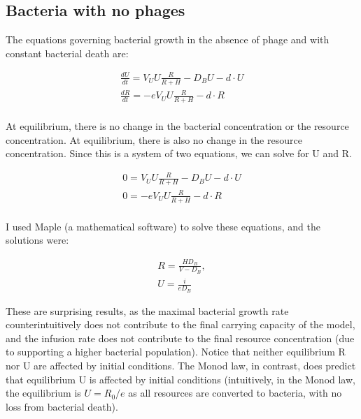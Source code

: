 \documentclass{article}
\begin{document}
\subsection{Bacteria with no phages}
The equations governing bacterial growth in the absence of phage and with constant bacterial death are:

\begin{equation}
\begin{split}
\frac{dU}{dt} = V_UU\frac{R}{R+H} - D_BU - d \cdot U \\
\frac{dR}{dt} = -eV_UU\frac{R}{R+H}  - d \cdot R \\
\end{split}
\end{equation}

At equilibrium, there is no change in the bacterial concentration or the resource concentration. At equilibrium, there is also no change in the resource concentration. Since this is a system of two equations, we can solve for U and R. 

\begin{equation}
\begin{split}
0 = V_UU\frac{R}{R+H} - D_BU - d \cdot U \\
0 = -eV_UU\frac{R}{R+H}  - d \cdot R \\
\end{split}
\end{equation}

I used Maple (a mathematical software) to solve these equations, and the solutions were:

\begin{equation}
\begin{split}
R = \frac{HD_B}{V - D_B}, \\ U = \frac{i}{eD_B}
\end{split}
\end{equation}

These are surprising results, as the maximal bacterial growth rate counterintuitively does not contribute to the final carrying capacity of the model, and the infusion rate does not contribute to the final resource concentration (due to supporting a higher bacterial population). Notice that neither equilibrium R nor U are affected by initial conditions. The Monod law, in contrast, does predict that equilibrium U is affected by initial conditions (intuitively, in the Monod law, the equilibrium is $U = R_0/e$ as all resources are converted to bacteria, with no loss from bacterial death). 
\end{document}
